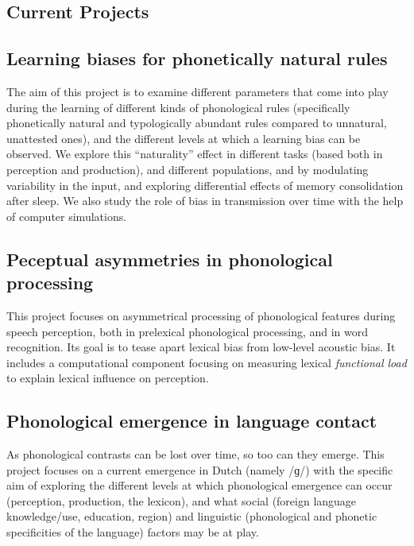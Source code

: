 \documentclass[a4paper, 10pt]{article}
\begin{document}
\begin{RaggedRight}

\section*{Current Projects}

\subsection*{Learning biases for phonetically natural rules}

The aim of this project is to examine different parameters that come into play
during the learning of different kinds of phonological rules
(specifically phonetically natural and typologically abundant rules
compared to unnatural, unattested ones), and the different levels at which a
learning bias can be observed. We explore this “naturality”
effect in different tasks (based both in perception and
production), and different populations, and by modulating
variability in the input, and exploring differential effects of
memory consolidation after sleep. We also study the role of bias
in transmission over time with the help of computer simulations.


\subsection*{Peceptual asymmetries in phonological processing}

This project focuses on asymmetrical processing of phonological
features during speech perception, both in prelexical phonological
processing, and in word recognition.  Its goal is to tease apart
lexical bias from low-level acoustic bias.  It includes a
computational component focusing on measuring lexical \emph{functional
load} to explain lexical influence on perception.


\subsection*{Phonological emergence in language contact}

As phonological contrasts can be lost over time, so too can they
emerge.  This project focuses on a current emergence in Dutch (namely
{/ɡ/}) with the specific aim of exploring the different levels at which
phonological emergence can occur (perception, production, the
lexicon), and what social (foreign language knowledge/use, education,
region) and linguistic (phonological and phonetic specificities of the
language) factors may be at play.


\end{RaggedRight}
\end{document}
